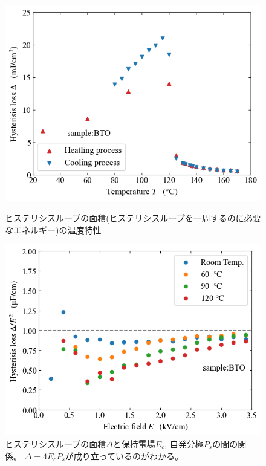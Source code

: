 \documentclass[9pt,dvipdfmx,a4paper]{jsarticle}
\begin{document}
\begin{figure}[H]
    \begin{minipage}[t]{0.48\columnwidth}
        \centering
        \includegraphics[width=\columnwidth]{BTO_Delta-T.png}
        \caption{\small{ヒステリシスループの面積(ヒステリシスループを一周するのに必要なエネルギー)の温度特性}}
        \label{graph:BTO_Delta-T}
    \end{minipage}
    \hfill
    \begin{minipage}[t]{0.48\columnwidth}
        \centering
        \includegraphics[width=\columnwidth]{BTO_Delta-E.png}
        \caption{\small{ヒステリシスループの面積\(\Delta\)と保持電場\(E_c\), 自発分極\(P_s\)の間の関係。
        \(\Delta=4E_cP_s\)が成り立っているのがわかる。}}
        \label{graph:BTO_Delta-E}
    \end{minipage}
\end{figure}
\end{document}
